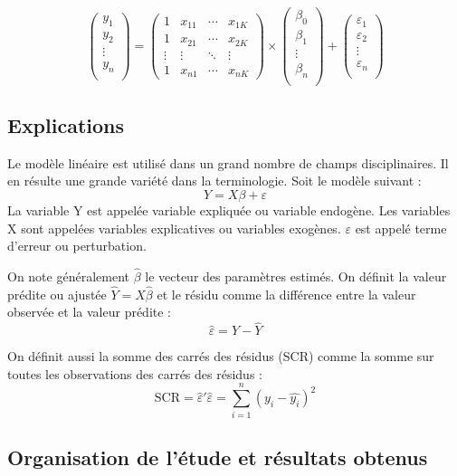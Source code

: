 \documentclass[a4paper, 11pt]{article}
\begin{document}
\[
\begin{pmatrix}
y_1 \\
y_2 \\
\vdots \\
y_n \\
\end{pmatrix}
=
\begin{pmatrix}
1 & x_11 & \cdots & x_{1K} \\
1 & x_21 & \cdots & x_{2K} \\
\vdots & \vdots & \ddots & \vdots \\
1 & x_{n1} & \cdots & x_{nK}
\end{pmatrix}
\times
\begin{pmatrix}
\beta_0\\
\beta_1\\
\vdots \\
\beta_n\\
\end{pmatrix}
+
\begin{pmatrix}
\varepsilon_1\\
\varepsilon_2\\
\vdots \\
\varepsilon_n\\
\end{pmatrix}
\]

\subsection{Explications}

Le modèle linéaire est utilisé dans un grand nombre de champs disciplinaires. Il en résulte une grande variété dans la terminologie. Soit le modèle suivant : 
\[
Y = X\beta + \varepsilon
\]
La variable Y est appelée variable expliquée ou variable endogène. Les variables X sont appelées variables explicatives ou variables exogènes. $\varepsilon$ est appelé terme d'erreur ou perturbation.

On note généralement $\hat{\beta}$ le vecteur des paramètres estimés. On définit la valeur prédite ou ajustée $\hat{Y} = X\hat{\beta}$ et le résidu comme la différence entre la valeur observée et la valeur prédite : 
\[
\hat{\varepsilon} = Y - \hat{Y}
\]

On définit aussi la somme des carrés des résidus (SCR) comme la somme sur toutes les observations des carrés des résidus :
\[
\mathrm{SCR} = \hat{\varepsilon}'\hat{\varepsilon} = \sum_{i=1}^{n}(y_{i}-\hat{y_{i}})^2
\]
\subsection{Organisation de l'étude et résultats obtenus}
\end{document}
